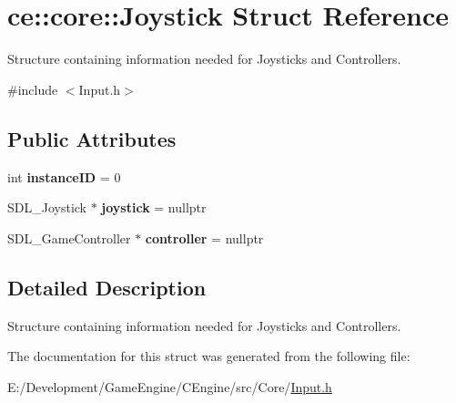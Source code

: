 \hypertarget{structce_1_1core_1_1_joystick}{}\section{ce\+:\+:core\+:\+:Joystick Struct Reference}
\label{structce_1_1core_1_1_joystick}


Structure containing information needed for Joysticks and Controllers.  




{\ttfamily \#include $<$Input.\+h$>$}

\subsection*{Public Attributes}
\begin{DoxyCompactItemize}
\item 
\mbox{\label{structce_1_1core_1_1_joystick_a91d7c9adbb3e74b6e6379e50ff71c7b9}} 
int {\bfseries instance\+ID} = 0
\item 
\mbox{\label{structce_1_1core_1_1_joystick_a7d8e4662b79ba8cf85ada42f146d0cb9}} 
S\+D\+L\+\_\+\+Joystick $\ast$ {\bfseries joystick} = nullptr
\item 
\mbox{\label{structce_1_1core_1_1_joystick_a4becd96a25a7cfc34e53abde7b948810}} 
S\+D\+L\+\_\+\+Game\+Controller $\ast$ {\bfseries controller} = nullptr
\end{DoxyCompactItemize}


\subsection{Detailed Description}
Structure containing information needed for Joysticks and Controllers. 

The documentation for this struct was generated from the following file\+:\begin{DoxyCompactItemize}
\item 
E\+:/\+Development/\+Game\+Engine/\+C\+Engine/src/\+Core/\hyperlink{_input_8h}{Input.\+h}\end{DoxyCompactItemize}
